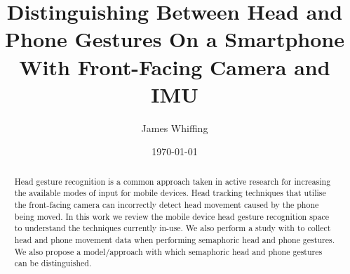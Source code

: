 


%
%

\title{Distinguishing Between Head and Phone Gestures On a Smartphone With Front-Facing Camera and IMU}
\date{\today}
\author{James Whiffing} %
\renewcommand{\shortauthors}{Whiffing, James}

\begin{abstract}
    Head gesture recognition is a common approach taken in active research for increasing the available modes of input for mobile devices.
    Head tracking techniques that utilise the front-facing camera can incorrectly detect head movement caused by the phone being moved.
    In this work we review the mobile device head gesture recognition space to understand the techniques currently in-use. 
    We also perform a study with to collect head and phone movement data when performing semaphoric head and phone gestures. 
    We also propose a model/approach with which semaphoric head and phone gestures can be distinguished.
\end{abstract}

